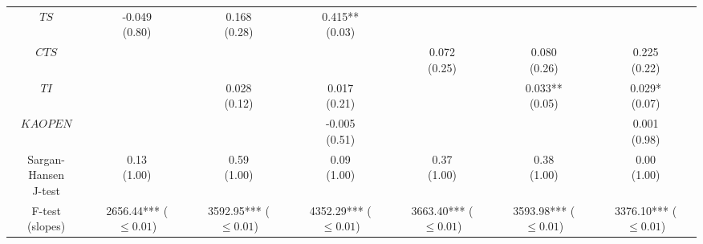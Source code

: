 \begin{tabular}{ccccccc}
                                          $TS$ &             \makecell{-0.049\\(0.80)} &              \makecell{0.168\\(0.28)} &            \makecell{0.415**\\(0.03)} &                                       &                                       &                                       \\
                                         $CTS$ &                                       &                                       &                                       &              \makecell{0.072\\(0.25)} &              \makecell{0.080\\(0.26)} &              \makecell{0.225\\(0.22)} \\
                                          $TI$ &                                       &              \makecell{0.028\\(0.12)} &              \makecell{0.017\\(0.21)} &                                       &            \makecell{0.033**\\(0.05)} &             \makecell{0.029*\\(0.07)} \\
                                      $KAOPEN$ &                                       &                                       &             \makecell{-0.005\\(0.51)} &                                       &                                       &              \makecell{0.001\\(0.98)} \\
              \makecell{Sargan-Hansen\\J-test} &               \makecell{0.13\\(1.00)} &               \makecell{0.59\\(1.00)} &               \makecell{0.09\\(1.00)} &               \makecell{0.37\\(1.00)} &               \makecell{0.38\\(1.00)} &               \makecell{0.00\\(1.00)} \\
                   \makecell{F-test\\(slopes)} &  \makecell{2656.44***\\($\leq 0.01$)} &  \makecell{3592.95***\\($\leq 0.01$)} &  \makecell{4352.29***\\($\leq 0.01$)} &  \makecell{3663.40***\\($\leq 0.01$)} &  \makecell{3593.98***\\($\leq 0.01$)} &  \makecell{3376.10***\\($\leq 0.01$)} \\

\end{tabular}
